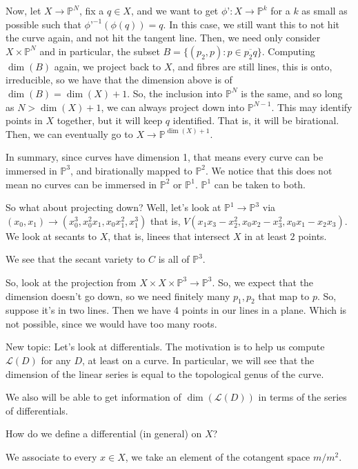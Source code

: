 \documentclass[10pt]{article}
\begin{document}
Now, let $X \to \mathbb{P}^N$, fix a $q \in X$, and we want to get $\phi’: X \to \mathbb{P}^k$ for a $k$ as small as possible such that $\phi’^{-1}(\phi(q)) = q$. In this case, we still want this to not hit the curve again, and not hit the tangent line. Then, we need only consider $X \times \mathbb{P}^N$ and in particular, the subset $B = \{ (p_2, p) : p \in \overline{p_2q} \}$. Computing $\dim(B)$ again, we project back to $X$, and fibres are still lines, this is onto, irreducible, so we have that the dimension above is of $\dim(B) = \dim(X)+1$. So, the inclusion into $\mathbb{P}^N$ is the same, and so long as $N > \dim(X) + 1$, we can always project down into $\mathbb{P}^{N-1}$. This may identify points in $X$ together, but it will keep $q$ identified. That is, it will be birational. Then, we can eventually go to $X \to \mathbb{P}^{\dim(X) + 1}$.

In summary, since curves have dimension 1, that means every curve can be immersed in $\mathbb{P}^3$, and birationally mapped to $\mathbb{P}^2$. We notice that this does not mean no curves can be immersed in $\mathbb{P}^2$ or $\mathbb{P}^1$. $\mathbb{P}^1$ can be taken to both. 

So what about projecting down? Well, let’s look at $\mathbb{P}^1 \to \mathbb{P}^3$ via $(x_0,x_1) \to (x_0^3, x_0^2x_1, x_0x_1^2, x_1^3)$ that is, $V(x_1x_3 - x_2^2, x_0x_2 - x_3^2, x_0x_1 - x_2x_3)$. We look at secants to $X$, that is, linees that intersect $X$ in at least $2$ points.

We see that the secant variety to $C$ is all of $\mathbb{P}^3$.

So, look at the projection from $X \times X \times \mathbb{P}^3 \to \mathbb{P}^3$. So, we expect that the dimension doesn’t go down, so we need finitely many $p_1,p_2$ that map to $p$. So, suppose it’s in two lines. Then we have 4 points in our lines in a plane. Which is not possible, since we would have too many roots.

New topic: Let’s look at differentials. The motivation is to help us compute $\mathcal{L}(D)$ for any $D$, at least on a curve. In particular, we will see that the dimension of the linear series is equal to the topological genus of the curve.

We also will be able to get information of $\dim(\mathcal{L}(D))$ in terms of the series of differentials.

How do we define a differential (in general) on $X$?

We associate to every $ x \in X$, we take an element of the cotangent space $m/m^2$. 
\end{document}

